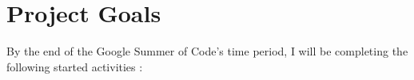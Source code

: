 \documentclass[preprint,12pt]{elsarticle}
\begin{document}



\section{Project Goals}
\label{S:1}

By the end of the Google Summer of Code's time period, I will be completing the following started activities :
\end{document}
